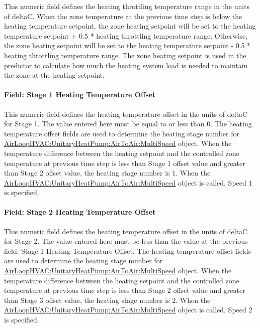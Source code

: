 This numeric field defines the heating throttling temperature range in the units of deltaC. When the zone temperature at the previous time step is below the heating temperature setpoint, the zone heating setpoint will be set to the heating temperature setpoint + 0.5 * heating throttling temperature range. Otherwise, the zone heating setpoint will be set to the heating temperature setpoint - 0.5 * heating throttling temperature range. The zone heating setpoint is used in the predictor to calculate how much the heating system load is needed to maintain the zone at the heating setpoint.

\paragraph{Field: Stage 1 Heating Temperature Offset}\label{field-stage-1-heating-temperature-offset}

This numeric field defines the heating temperature offset in the units of deltaC for Stage 1. The value entered here must be equal to or less than 0. The heating temperature offset fields are used to determine the heating stage number for \hyperref[airloophvacunitaryheatpumpairtoairmultispeed]{AirLoopHVAC:UnitaryHeatPump:AirToAir:MultiSpeed} object. When the temperature difference between the heating setpoint and the controlled zone temperature at previous time step is less than Stage 1 offset value and greater than Stage 2 offset value, the heating stage number is 1. When the \hyperref[airloophvacunitaryheatpumpairtoairmultispeed]{AirLoopHVAC:UnitaryHeatPump:AirToAir:MultiSpeed} object is called, Speed 1 is specified.

\paragraph{Field: Stage 2 Heating Temperature Offset}\label{field-stage-2-heating-temperature-offset}

This numeric field defines the heating temperature offset in the units of deltaC for Stage 2. The value entered here must be less than the value at the previous field: Stage 1 Heating Temperature Offset. The heating temperature offset fields are used to determine the heating stage number for \hyperref[airloophvacunitaryheatpumpairtoairmultispeed]{AirLoopHVAC:UnitaryHeatPump:AirToAir:MultiSpeed} object. When the temperature difference between the heating setpoint and the controlled zone temperature at previous time step is less than Stage 2 offset value and greater than Stage 3 offset value, the heating stage number is 2. When the \hyperref[airloophvacunitaryheatpumpairtoairmultispeed]{AirLoopHVAC:UnitaryHeatPump:AirToAir:MultiSpeed} object is called, Speed 2 is specified.

